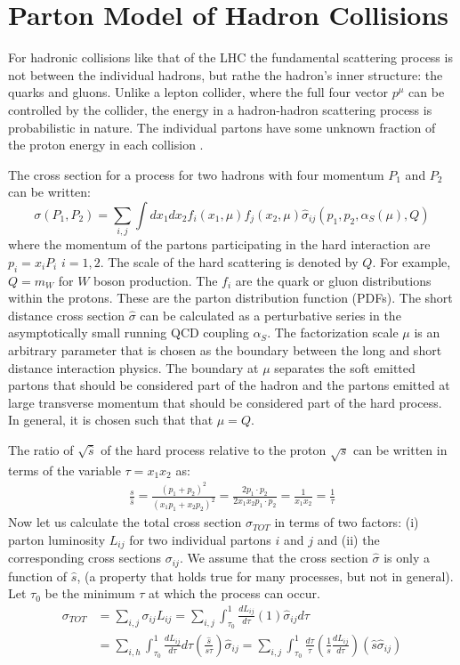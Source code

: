 \section{Parton Model of Hadron Collisions }

For hadronic collisions like that of the LHC the fundamental scattering process is not between the individual hadrons,
 but rathe the hadron's inner structure: the quarks and gluons. Unlike a lepton collider, where the full
 four vector $p^\mu$ can be controlled by the collider, the energy in a hadron-hadron
scattering process is probabilistic in nature. The individual partons have some unknown fraction of the proton energy
in each collision \cite{qcdcollider}. 

The cross section for a process for two hadrons with four momentum $P_1$ and $P_2$ can be written:
\begin{equation}
\sigma(P_1, P_2) = \sum_{i,j} \int dx_1 dx_2 f_i(x_1,\mu) f_j(x_2, \mu) \hat{\sigma}_{ij}(p_1, p_2, \alpha_S(\mu), Q)  
\end{equation}
where the momentum of the partons participating in the hard interaction are $p_i=x_i P_i$ $i=1,2$. The scale of the
hard scattering is denoted by $Q$. For example, $Q=m_W$ for $W$ boson production. The $f_i$ are the quark or gluon distributions within the protons. These are the parton distribution function (PDFs). The short distance
cross section $\hat \sigma$ can be calculated as a perturbative series in the asymptotically small running QCD coupling 
$\alpha_S$. The factorization scale $\mu$ is an arbitrary parameter that is chosen as the boundary between the long
and short distance interaction physics. The boundary at $\mu$ separates the soft emitted partons that should be
considered part of the hadron and the partons emitted at large transverse momentum that should be considered part 
of the hard process. In general, it is chosen such that that $\mu=Q$.

The ratio of $\sqrt{\hat s}$ of the hard process relative to the proton $\sqrt{s}$ can be written in terms of the variable $\tau = x_1x_2$ as:
\begin{align*}
\frac{s}{\hat s}=\frac{(p_1+p_2)^2}{(x_1p_1+x_2p_2)^2} = \frac{2p_1 \cdot p_2}{2x_1x_2 p_1 \cdot p_2} = \frac{1}{x_1x_2} = \frac{1}{\tau}
\end{align*}
Now let us calculate the total cross section $\sigma_{TOT}$ in terms of two factors: (i) parton luminosity $L_{ij}$ for two individual
partons $i$ and $j$ and (ii) the corresponding cross sections $\sigma_{ij}$. We assume that the cross section $\hat{\sigma}$ is 
only a function of $\hat s$, (a property that holds true for many processes, but not in general). Let $\tau_0$ be the 
minimum $\tau$ at which the process can occur.
\begin{align*}
\sigma_{TOT} &= \sum_{i,j} \sigma_{ij} L_{ij} = \sum_{i,j} \int_{\tau_0}^1  \frac{dL_{ij}}{d\tau}(1)\hat{\sigma}_{ij}  d\tau \\ 
& = \sum_{i,h} \int_{\tau_0}^1 \frac{dL_{ij}}{d\tau} d\tau \left ( \frac{\hat s}{s \tau} \right) \hat{\sigma}_{ij} 
= \sum_{i,j} \int_{\tau_0}^1 \frac{d\tau}{\tau} \left (\frac{1}{s} \frac{dL_{ij}}{d\tau} \right) \left(\hat{s} \hat{\sigma}_{ij}  \right) 
\end{align*}

